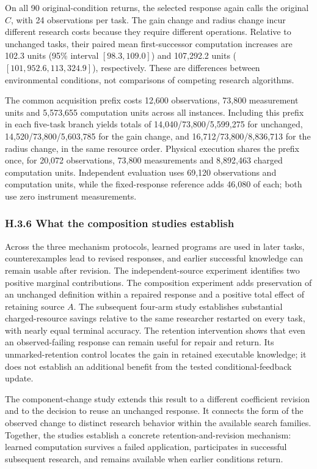 \documentclass[twoside,11pt]{article}
\begin{document}
On all 90 original-condition returns, the selected response again calls the original \(C\), with 24 observations per task. The gain change and radius change incur different research costs because they require different operations. Relative to unchanged tasks, their paired mean first-successor computation increases are 102.3 units (95\% interval \([98.3,109.0]\)) and 107,292.2 units (\([101{,}952.6,113{,}324.9]\)), respectively. These are differences between environmental conditions, not comparisons of competing research algorithms.


The common acquisition prefix costs 12,600 observations, 73,800 measurement units and 5,573,655 computation units across all instances. Including this prefix in each five-task branch yields totals of 14,040/73,800/5,599,275 for unchanged, 14,520/73,800/5,603,785 for the gain change, and 16,712/73,800/8,836,713 for the radius change, in the same resource order. Physical execution shares the prefix once, for 20,072 observations, 73,800 measurements and 8,892,463 charged computation units. Independent evaluation uses 69,120 observations and computation units, while the fixed-response reference adds 46,080 of each; both use zero instrument measurements.


\subsubsection*{H.3.6 What the composition studies establish}

Across the three mechanism protocols, learned programs are used in later tasks, counterexamples lead to revised responses, and earlier successful knowledge can remain usable after revision. The independent-source experiment identifies two positive marginal contributions. The composition experiment adds preservation of an unchanged definition within a repaired response and a positive total effect of retaining source \(A\). The subsequent four-arm study establishes substantial charged-resource savings relative to the same researcher restarted on every task, with nearly equal terminal accuracy. The retention intervention shows that even an observed-failing response can remain useful for repair and return. Its unmarked-retention control locates the gain in retained executable knowledge; it does not establish an additional benefit from the tested conditional-feedback update.


The component-change study extends this result to a different coefficient revision and to the decision to reuse an unchanged response. It connects the form of the observed change to distinct research behavior within the available search families. Together, the studies establish a concrete retention-and-revision mechanism: learned computation survives a failed application, participates in successful subsequent research, and remains available when earlier conditions return.
\end{document}

